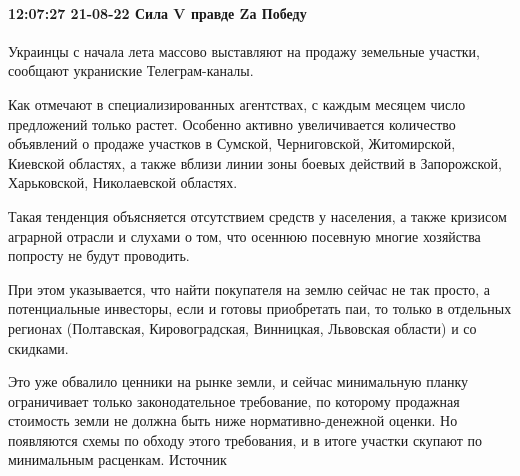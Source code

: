  
 
 
 
 

\paragraph{12:07:27 21-08-22 Сила V правде Zа Победу 💚💕}

Украинцы с начала лета массово выставляют на продажу земельные участки,
сообщают украниские Телеграм-каналы.

Как отмечают в специализированных агентствах, с каждым месяцем число
предложений только растет. Особенно активно увеличивается количество объявлений
о продаже участков в Сумской, Черниговской, Житомирской, Киевской областях, а
также вблизи линии зоны боевых действий в Запорожской, Харьковской,
Николаевской областях.

Такая тенденция объясняется отсутствием средств у населения, а также кризисом
аграрной отрасли и слухами о том, что осеннюю посевную многие хозяйства
попросту не будут проводить.

При этом указывается, что найти покупателя на землю сейчас не так просто, а
потенциальные инвесторы, если и готовы приобретать паи, то только в отдельных
регионах (Полтавская, Кировоградская, Винницкая, Львовская области) и со
скидками.

Это уже обвалило ценники на рынке земли, и сейчас минимальную планку
ограничивает только законодательное требование, по которому продажная стоимость
земли не должна быть ниже нормативно-денежной оценки. Но появляются схемы по
обходу этого требования, и в итоге участки скупают по минимальным расценкам.
Источник

